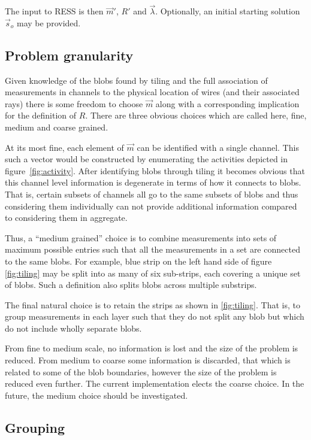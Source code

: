 \documentclass[11pt]{article}
\begin{document}
\noindent The input to RESS is then $\vec{m}'$, $R'$ and $\vec{\lambda}$.  Optionally, an initial starting solution $\vec{s}_o$ may be provided.



\subsection{Problem granularity}
\label{sec:granularity}

Given knowledge of the blobs found by tiling and the full association of measurements in channels to the physical location of wires (and their associated rays) there is some freedom to choose \(\vec{m}\) along with a corresponding implication for the definition of \(R\).  There are three obvious choices which are called here, fine, medium and coarse grained.  

At its most fine, each element of \(\vec{m}\) can be identified with a single channel.  This such a vector would be constructed by enumerating the activities depicted in figure~\ref{fig:activity}.  After identifying blobs through tiling it becomes obvious that this channel level information is degenerate in terms of how it connects to blobs.  That is, certain subsets of channels all go to the same subsets of blobs and thus considering them individually can not provide additional information compared to considering them in aggregate. 

Thus, a ``medium grained'' choice is to combine measurements into sets of maximum possible entries such that all the measurements in a set are connected to the same blobs.  For example, blue strip on the left hand side of figure \ref{fig:tiling} may be split into as many of six sub-strips, each covering a unique set of blobs.  Such a definition also splits blobs across multiple substrips.

The final natural choice is to retain the strips as shown in \ref{fig:tiling}.  That is, to group measurements in each layer such that they do not split any blob but which do not include wholly separate blobs.

From fine to medium scale, no information is lost and the size of the problem is reduced.  From medium to coarse some information is discarded, that which is related to some of the blob boundaries, however the size of the problem is reduced even further.  The current implementation elects the coarse choice.  In the future, the medium choice should be investigated.

\subsection{Grouping}
\label{sec:grouping}
\end{document}
